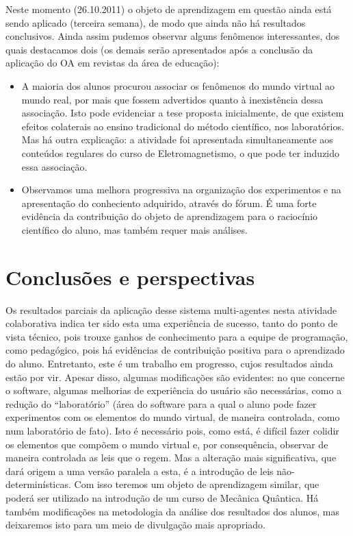 \documentclass{article}
\begin{document}
Neste momento (26.10.2011) o objeto de aprendizagem em questão ainda está
sendo aplicado (terceira semana), de modo que ainda não há resultados conclusivos.
Ainda assim pudemos observar alguns fenômenos interessantes, dos quais destacamos
dois (os demais serão apresentados após a conclusão da aplicação do OA em revistas da
área de educação):

\begin{itemize}
\item A maioria dos alunos procurou associar os fenômenos do mundo virtual ao
mundo real, por mais que fossem advertidos quanto à inexistência dessa
associação. Isto pode evidenciar a tese proposta inicialmente, de que existem
efeitos colaterais ao ensino tradicional do método científico, nos laboratórios.
Mas há outra explicação: a atividade foi apresentada simultaneamente aos
conteúdos regulares do curso de Eletromagnetismo, o que pode ter induzido essa
associação.
\item Observamos uma melhora progressiva na organização dos experimentos e na
apresentação do conheciento adquirido, através do fórum. É uma forte evidência
da contribuição do objeto de aprendizagem para o raciocínio científico do aluno,
mas também requer mais análises.
\end{itemize}

\section{Conclusões e perspectivas}

Os resultados parciais da aplicação desse sistema multi-agentes nesta atividade
colaborativa indica ter sido esta uma experiência de sucesso, tanto do ponto de vista
técnico, pois trouxe ganhos de conhecimento para a equipe de programação, como
pedagógico, pois há evidências de contribuição positiva para o aprendizado do aluno.
Entretanto, este é um trabalho em progresso, cujos resultados ainda estão por
vir. Apesar disso, algumas modificações são evidentes: no que concerne o software,
algumas melhorias de experiência do usuário são necessárias, como a redução
do “laboratório” (área do software para a qual o aluno pode fazer experimentos com
os elementos do mundo virtual, de maneira controlada, como num laboratório de fato).
Isto é necessário pois, como está, é difícil fazer colidir os elementos que compõem o
mundo virtual e, por consequência, observar de maneira controlada as leis que o regem.
Mas a alteração mais significativa, que dará origem a uma versão paralela a esta, é a
introdução de leis não-determinísticas. Com isso teremos um objeto de aprendizagem
similar, que poderá ser utilizado na introdução de um curso de Mecânica Quântica.
Há também modificações na metodologia da análise dos resultados dos alunos, mas
deixaremos isto para um meio de divulgação mais apropriado.
\end{document}
